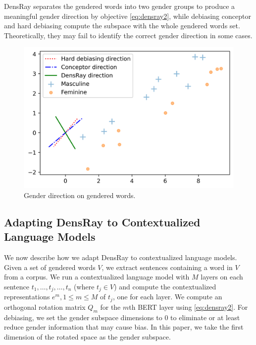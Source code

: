 DensRay separates the gendered words into two gender groups to produce a meaningful gender direction by objective \eqref{eq:densray2}, while debiasing conceptor and hard debiasing compute the subspace with the whole gendered words set. Theoretically, they may fail to identify the correct gender direction in some cases. 
\begin{figure}[h]
	\centering
	\includegraphics[width=0.5\linewidth]{examples.png}
	\caption{Gender direction on gendered words.}
\end{figure}

\subsection{Adapting DensRay to Contextualized Language Models}
We now describe how we adapt DensRay to contextualized
language models. Given a set of gendered words
$V$, we extract sentences containing a word in $V$ from a
corpus. We run a contextualized language model
with $M$ layers
on each
sentence
$t_1,\ldots,t_j,\ldots,t_n$ (where $t_j \in V$)
and compute the contextualized representations $e^m, 1\leq m
\leq M$ of $t_j$, one for each layer. 
We compute an orthogonal rotation
matrix $Q_m$ for the $m$th BERT layer using \eqref{eq:densray2}.
For debiasing, we set the gender subspace dimensions to $0$ to eliminate or at least reduce gender information that may cause bias. In this paper, we take the first dimension of the rotated space as the gender subspace.

